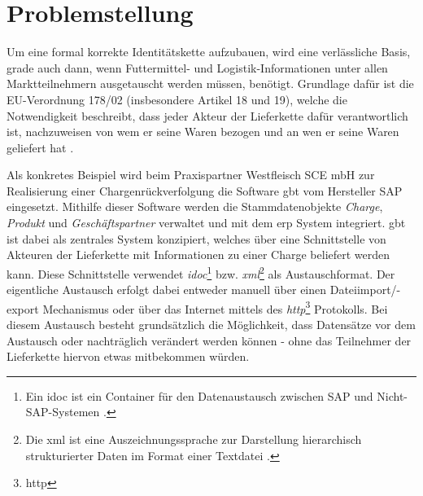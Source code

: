 \section{Problemstellung} \label{Problemstellung}

Um eine formal korrekte Identitätskette aufzubauen, wird eine verlässliche Basis, grade auch dann, wenn Futtermittel- und Logistik-Informationen unter allen Marktteilnehmern ausgetauscht werden müssen, benötigt. Grundlage dafür ist die EU-Verordnung 178/02 (insbesondere Artikel 18 und 19), welche die Notwendigkeit beschreibt, dass jeder Akteur der Lieferkette dafür verantwortlich ist, nachzuweisen von wem er seine Waren bezogen und an wen er seine Waren geliefert hat \citep{EPER2002}.

Als konkretes Beispiel wird beim Praxispartner Westfleisch SCE mbH zur Realisierung einer Chargenrückverfolgung die Software \ac{gbt} vom Hersteller SAP eingesetzt. Mithilfe dieser Software werden die Stammdatenobjekte \textit{Charge}, \textit{Produkt} und \textit{Geschäftspartner} verwaltet und mit dem \ac{erp} System integriert. \ac{gbt} ist dabei als zentrales System konzipiert, welches über eine Schnittstelle von Akteuren der Lieferkette mit Informationen zu einer Charge beliefert werden kann. Diese Schnittstelle verwendet \textit{\acs{idoc}}\footnote{Ein \ac{idoc} ist ein Container für den Datenaustausch zwischen SAP und Nicht-SAP-Systemen \citep{SAP2019}.} bzw. \textit{\acs{xml}}\footnote{Die \ac{xml} ist eine Auszeichnungssprache zur Darstellung hierarchisch strukturierter Daten im Format einer Textdatei \citep{Yergeau2008}.} als Austauschformat. Der eigentliche Austausch erfolgt dabei entweder manuell über einen Dateiimport/-export Mechanismus oder über das Internet mittels des \textit{\acs{http}}\footnote{\ac{http}} Protokolls. Bei diesem Austausch besteht grundsätzlich die Möglichkeit, dass Datensätze vor dem Austausch oder nachträglich verändert werden können - ohne das Teilnehmer der Lieferkette hiervon etwas mitbekommen würden.\\


